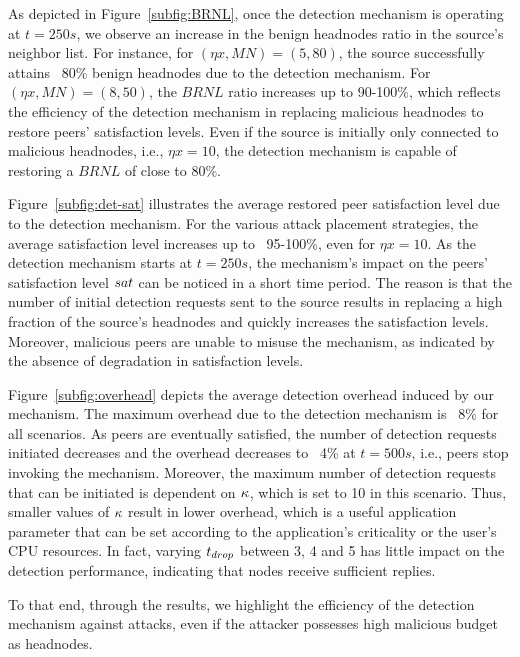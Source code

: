 As depicted in Figure~\ref{subfig:BRNL}, once the detection mechanism is operating at $t=250s$, we observe an increase in the benign headnodes ratio in the source's neighbor list.
For instance, for $(\eta x, MN)=(5, 80)$, the source successfully attains ~80\% benign headnodes due to the detection mechanism.
For $(\eta x, MN)=(8, 50)$, the $BRNL$ ratio increases up to 90-100\%, which reflects the efficiency of the detection mechanism in replacing malicious headnodes to restore peers' satisfaction levels. 
Even if the source is initially only connected to malicious headnodes, i.e., $\eta x=10$, the detection mechanism is capable of restoring a $BRNL$ of close to 80\%. 

Figure~\ref{subfig:det-sat} illustrates the average restored peer satisfaction level due to the detection mechanism.
For the various attack placement strategies, the average satisfaction level increases up to ~95-100\%, even for $\eta x=10$.
As the detection mechanism starts at $t=250s$, the mechanism's impact on the peers' satisfaction level $sat$ can be noticed in a short time period.
The reason is that the number of initial detection requests sent to the source results in replacing a high fraction of the source's headnodes and quickly increases the satisfaction levels. 
Moreover, malicious peers are unable to misuse the mechanism, as indicated by the absence of degradation in satisfaction levels. 

Figure~\ref{subfig:overhead} depicts the average detection overhead induced by our mechanism. 
The maximum overhead due to the detection mechanism is ~8\% for all scenarios.
As peers are eventually satisfied, the number of detection requests initiated decreases and the overhead decreases to ~4\% at $t=500s$, i.e., peers stop invoking the mechanism.
Moreover, the maximum number of detection requests that can be initiated is dependent on $\kappa$, which is set to 10 in this scenario.
Thus, smaller values of $\kappa$ result in lower overhead, which is a useful application parameter that can be set according to the application's criticality or the user's CPU resources.
In fact, varying $t_{drop}$ between 3, 4 and 5 has little impact on the detection performance, indicating that nodes receive sufficient replies.

To that end, through the results, we highlight the efficiency of the detection mechanism against \drop attacks, even if the attacker possesses high malicious budget as headnodes.



